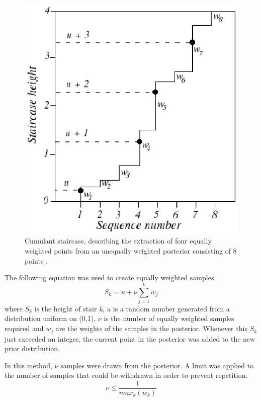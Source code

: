 \documentclass[a4paper,12pt]{article}
\begin{document}
\begin{figure}[!h]
 \begin{center}
  \includegraphics[scale=1]{staircase.eps}
  \caption{Cumulant staircase, describing the extraction of four equally weighted points from an unequally weighted posterior consisting of 8 points \cite{sivia}.}
 \end{center}
\end{figure}

The following equation was used to create equally weighted samples.  
\begin{equation}
 S_{k} = u + \nu \sum_{j=1}^{k} w_{j}
\end{equation}
where $S_{k}$ is the height of stair \textit{k}, $u$ is a random number generated from a distribution uniform on (0,1), $\nu$ is the number of equally weighted samples required and $w_{j}$ are the weights of the samples in the posterior.
\newline
Whenever this $S_{k}$ just exceeded an integer, the current point in the posterior was added to the new prior distribution.  

In this method, $\nu$ samples were drawn from the posterior.  A limit was applied to the number of samples that could be withdrawn in order to prevent repetition.
\begin{equation}
 \nu \leq \frac{1}{max_{k} (w_{k})}
\end{equation}
\end{document}
